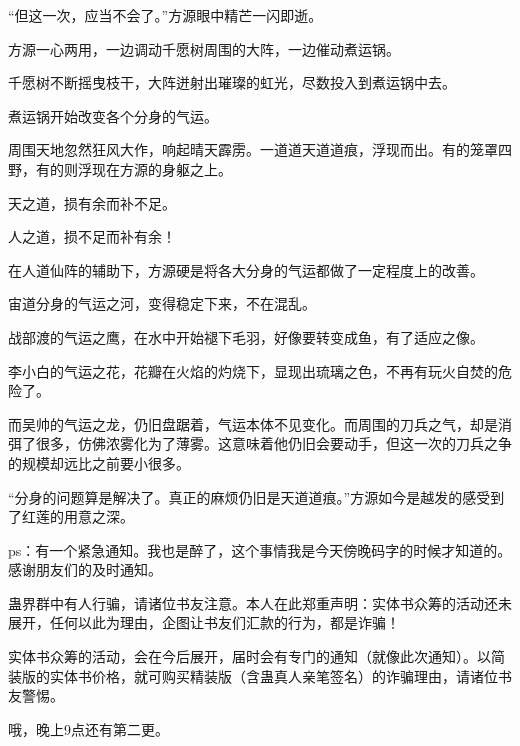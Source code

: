 \begin{this_body}
“但这一次，应当不会了。”方源眼中精芒一闪即逝。

方源一心两用，一边调动千愿树周围的大阵，一边催动煮运锅。

千愿树不断摇曳枝干，大阵迸射出璀璨的虹光，尽数投入到煮运锅中去。

煮运锅开始改变各个分身的气运。

周围天地忽然狂风大作，响起晴天霹雳。一道道天道道痕，浮现而出。有的笼罩四野，有的则浮现在方源的身躯之上。

天之道，损有余而补不足。

人之道，损不足而补有余！

在人道仙阵的辅助下，方源硬是将各大分身的气运都做了一定程度上的改善。

宙道分身的气运之河，变得稳定下来，不在混乱。

战部渡的气运之鹰，在水中开始褪下毛羽，好像要转变成鱼，有了适应之像。

李小白的气运之花，花瓣在火焰的灼烧下，显现出琉璃之色，不再有玩火自焚的危险了。

而吴帅的气运之龙，仍旧盘踞着，气运本体不见变化。而周围的刀兵之气，却是消弭了很多，仿佛浓雾化为了薄雾。这意味着他仍旧会要动手，但这一次的刀兵之争的规模却远比之前要小很多。

“分身的问题算是解决了。真正的麻烦仍旧是天道道痕。”方源如今是越发的感受到了红莲的用意之深。

ps：有一个紧急通知。我也是醉了，这个事情我是今天傍晚码字的时候才知道的。感谢朋友们的及时通知。

蛊界群中有人行骗，请诸位书友注意。本人在此郑重声明：实体书众筹的活动还未展开，任何以此为理由，企图让书友们汇款的行为，都是诈骗！

实体书众筹的活动，会在今后展开，届时会有专门的通知（就像此次通知）。以简装版的实体书价格，就可购买精装版（含蛊真人亲笔签名）的诈骗理由，请诸位书友警惕。

哦，晚上9点还有第二更。

\end{this_body}

